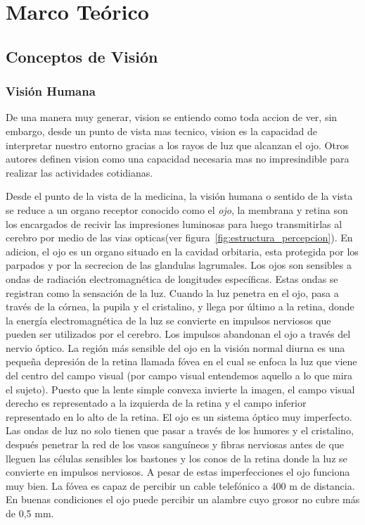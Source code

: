 \chapter{Marco Teórico}
\section{Conceptos de Visión}

\subsection{Visión Humana}
De una manera muy generar, vision se entiendo como toda accion de ver, sin embargo, desde un punto de vista mas tecnico, vision es la capacidad de interpretar nuestro entorno gracias a los rayos de luz que alcanzan el ojo. Otros autores definen vision como una capacidad necesaria mas no impresindible para realizar las actividades cotidianas.

Desde el punto de la vista de la medicina, la visión humana o sentido de la vista se reduce a un organo receptor conocido como el \textit{ojo}, la membrana y retina son los encargados de recivir las impresiones luminosas para luego transmitirlas al cerebro por medio de las vias opticas(ver figura~\ref{fig:estructura_percepcion}). En adicion, el ojo es un organo situado en la cavidad orbitaria, esta protegida por los parpados y por la secrecion de las glandulas lagrumales. Los ojos son sensibles a ondas de radiación electromagnética de longitudes específicas. Estas ondas se registran como la sensación de la luz. Cuando la luz penetra en el ojo, pasa a través de la córnea, la pupila y el cristalino, y llega por último a la retina, donde la energía electromagnética de la luz se convierte en impulsos nerviosos que pueden ser utilizados por el cerebro. Los impulsos abandonan el ojo a través del nervio
óptico. La región más sensible del ojo en la visión normal diurna es una pequeña depresión de la retina llamada fóvea en el cual se enfoca la luz que viene del centro del campo visual (por campo visual entendemos aquello a lo que mira el sujeto). Puesto que la lente simple convexa invierte la imagen, el campo visual derecho es representado a la izquierda de la retina y el campo inferior representado en lo alto de la retina. El ojo es un sistema óptico muy imperfecto. Las ondas de luz no solo tienen que pasar a través de los humores y el cristalino, después penetrar la red de los vasos sanguíneos y fibras nerviosas antes de que lleguen las células sensibles los bastones y los conos de la retina donde la luz se convierte en impulsos nerviosos. A pesar de estas imperfecciones el ojo funciona muy bien. La fóvea es capaz de percibir un cable telefónico a 400 m de distancia. En buenas condiciones el ojo puede percibir un alambre cuyo grosor no cubre más de 0,5 mm.

